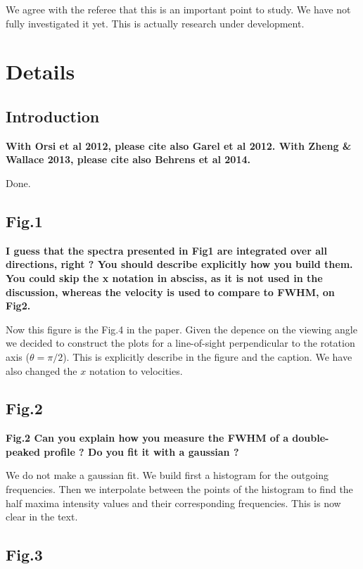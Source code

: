 \documentclass[12pt]{article}
\begin{document}
We agree with the referee that this is an important point to study. 
We have not fully investigated it yet.  This is actually research
under development.   

\section*{Details}

\subsection*{Introduction}

{\bf With Orsi et al 2012, please cite also Garel et al 2012. With
  Zheng \& Wallace 2013, please cite also Behrens et al 2014.} 

Done.

\subsection*{Fig.1}

{\bf I guess that the spectra presented in Fig1 are integrated over
  all directions, right ? You should describe explicitly how you build
  them. You could skip the x notation in absciss, as it is not used in
  the discussion, whereas the velocity is used to compare to FWHM, on
  Fig2.} 

Now this figure is the Fig.4 in the paper. Given the depence on the
viewing angle we decided to construct the plots for a line-of-sight
perpendicular to the rotation axis ($\theta=\pi/2$). This is
explicitly describe in the figure and the caption. We have also
changed the $x$ notation to velocities.

\subsection*{Fig.2}

{\bf Fig.2 Can you explain how you measure the FWHM of a double-peaked
  profile ? Do you fit it with a gaussian ?} 


We do not make a gaussian fit. We build first a histogram for the
outgoing frequencies. Then we interpolate between the points of the
histogram to find the half maxima intensity values and their
corresponding frequencies. This is now clear in the text.

\subsection*{Fig.3}
\end{document}
